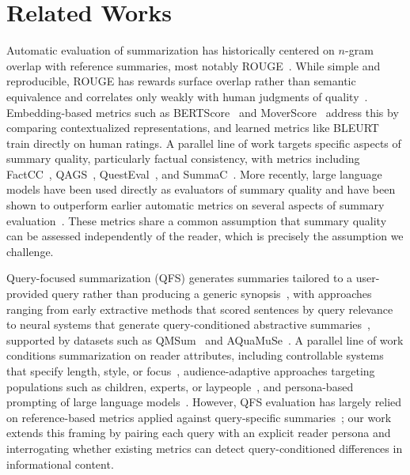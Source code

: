 \section{Related Works}\label{sec:ch-7-related_work}

Automatic evaluation of summarization has historically centered on $n$-gram overlap with reference summaries, most notably ROUGE~\cite{lin2004rouge}. While simple and reproducible, ROUGE has rewards surface overlap rather than semantic equivalence and correlates only weakly with human judgments of quality~\cite{liu2008correlation,bhandari2020reevaluating}. Embedding-based metrics such as BERTScore~\cite{zhang2020bertscore} and MoverScore~\cite{zhao2019moverscore} address this by comparing contextualized representations, and learned metrics like BLEURT~\cite{sellam2020bleurt} train directly on human ratings. A parallel line of work targets specific aspects of summary quality, particularly factual consistency, with metrics including FactCC~\cite{kryscinski2020evaluating}, QAGS~\cite{wang2020asking}, QuestEval~\cite{scialom2021questeval}, and SummaC~\cite{laban2022summac}. More recently, large language models have been used directly as evaluators of summary quality and have been shown to outperform earlier automatic metrics on several aspects of summary evaluation~\cite{liu2023geval,fu2024gptscore,chiang2023llmeval}. These metrics share a common assumption that summary quality can be assessed independently of the reader, which is precisely the assumption we challenge.

Query-focused summarization (QFS) generates summaries tailored to a user-provided query rather than producing a generic synopsis~\cite{daume2006bayesian,dang2005duc}, with approaches ranging from early extractive methods that scored sentences by query relevance~\cite{wan2007manifold,otterbacher2009biased} to neural systems that generate query-conditioned abstractive summaries~\cite{baumel2018query,xu2020coarse,vig2022exploring}, supported by datasets such as QMSum~\cite{zhong2021qmsum} and AQuaMuSe~\cite{kulkarni2020aquamuse}. A parallel line of work conditions summarization on reader attributes, including controllable systems that specify length, style, or focus~\cite{fan2018controllable,he2022ctrlsum}, audience-adaptive approaches targeting populations such as children, experts, or laypeople~\cite{chandrasekaran2020overview,august2022paperplain,goldsack2022making,luo2022readability}, and persona-based prompting of large language models~\cite{deshpande2023toxicity,zhang2024personallm}. However, QFS evaluation has largely relied on reference-based metrics applied against query-specific summaries~\cite{zhong2021qmsum,vig2022exploring}; our work extends this framing by pairing each query with an explicit reader persona and interrogating whether existing metrics can detect query-conditioned differences in informational content.

